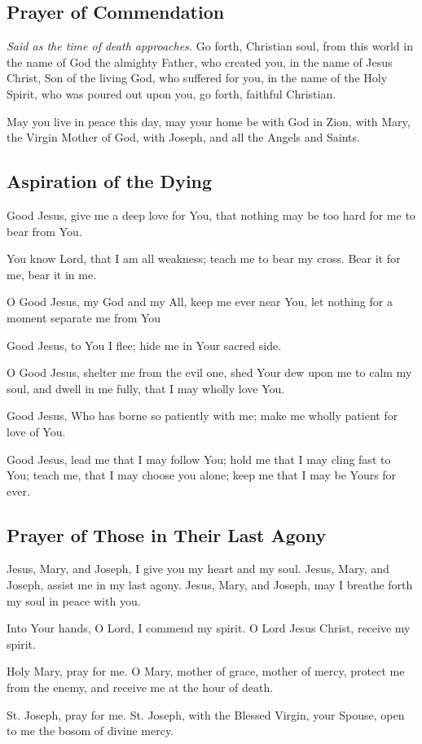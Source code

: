 \documentclass[12pt]{article}
\newcommand{\prayertitle}[1]{\subsection{#1}}
\newcommand{\note}[1]{{\small{\textsl{#1}}}\newline}
\begin{document}
\prayertitle{Prayer of Commendation}
\note{Said as the time of death approaches.}
Go forth, Christian soul, from this world in the name of God the almighty Father, who created you, in the name of Jesus Christ, Son of the living God, who suffered for you, in the name of the Holy Spirit, who was poured out upon you, go forth, faithful Christian.

May you live in peace this day, may your home be with God in Zion, with Mary, the Virgin Mother of God, with Joseph, and all the Angels and Saints.

\prayertitle{Aspiration of the Dying}
Good Jesus, give me a deep love for You, that nothing may be too hard for me to bear from You.

You know Lord, that I am all weakness; teach me to bear my cross.
Bear it for me, bear it in me.

O Good Jesus, my God and my All, keep me ever near You, let nothing for a moment separate me from You

Good Jesus, to You I flee;
hide me in Your sacred side.

O Good Jesus, shelter me from the evil one, shed Your dew upon me to calm my soul, and dwell in me fully, that I may wholly love You.

Good Jesus, Who has borne so patiently with me;
make me wholly patient for love of You.

Good Jesus, lead me that I may follow You; hold me that I may cling fast to You;
teach me, that I may choose you alone; keep me that I may be Yours for ever.

\prayertitle{Prayer of Those in Their Last Agony}
Jesus, Mary, and Joseph, I give you my heart and my soul.
Jesus, Mary, and Joseph, assist me in my last agony.
Jesus, Mary, and Joseph, may I breathe forth my soul in peace with you.

Into Your hands, O Lord, I commend my spirit.
O Lord Jesus Christ, receive my spirit.

Holy Mary, pray for me.
O Mary, mother of grace, mother of mercy, protect me from the enemy, and receive me at the hour of death.

St. Joseph, pray for me.
St. Joseph, with the Blessed Virgin, your Spouse, open to me the bosom of divine mercy.
\end{document}
